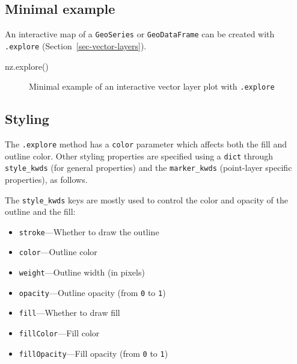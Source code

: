 \documentclass[
  letterpaper,
]{krantz}
\newenvironment{Shaded}{\begin{snugshade}}{\end{snugshade}}
\newcommand{\NormalTok}[1]{\textcolor[rgb]{0.00,0.23,0.31}{#1}}
\providecommand{\tightlist}{%
  \setlength{\itemsep}{0pt}\setlength{\parskip}{0pt}}\usepackage{longtable,booktabs,array}
\begin{document}
\subsection{Minimal example}\label{minimal-example}

An interactive map of a \texttt{GeoSeries} or \texttt{GeoDataFrame} can
be created with \texttt{.explore} (Section~\ref{sec-vector-layers}).

\begin{Shaded}
\begin{Highlighting}[]
\NormalTok{nz.explore()}
\end{Highlighting}
\end{Shaded}

\begin{figure}


\caption{\label{fig-explore}Minimal example of an interactive vector
layer plot with \texttt{.explore}}

\end{figure}%

\subsection{Styling}\label{sec-interactive-styling}

The \texttt{.explore} method has a \texttt{color} parameter which
affects both the fill and outline color. Other styling properties are
specified using a \texttt{dict} through \texttt{style\_kwds} (for
general properties) and the \texttt{marker\_kwds} (point-layer specific
properties), as follows.

The \texttt{style\_kwds} keys are mostly used to control the color and
opacity of the outline and the fill:

\begin{itemize}
\tightlist
\item
  \texttt{stroke}---Whether to draw the outline
\item
  \texttt{color}---Outline color
\item
  \texttt{weight}---Outline width (in pixels)
\item
  \texttt{opacity}---Outline opacity (from \texttt{0} to \texttt{1})
\item
  \texttt{fill}---Whether to draw fill
\item
  \texttt{fillColor}---Fill color
\item
  \texttt{fillOpacity}---Fill opacity (from \texttt{0} to \texttt{1})
\end{itemize}
\end{document}
